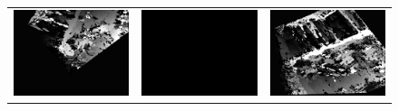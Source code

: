 \documentclass[11pt]{report}
\begin{document}
\begin{figure}[H]
\begin{tabular}{ccc}
    \includegraphics[scale=0.1]{images/disparity-opencv-t/disparity_9.png} &
    \includegraphics[scale=0.1]{images/disparity-opencv-d/disparity_9.png} &
    \includegraphics[scale=0.1]{images/disparity-opengv/disparity_9.png} \\
  \end{tabular}
\end{figure}
\end{document}
